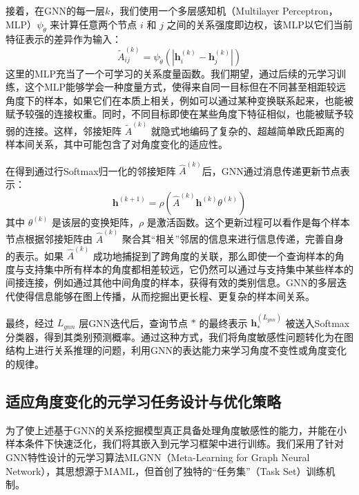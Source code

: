 接着，在GNN的每一层$k$，我们使用一个多层感知机（Multilayer Perceptron，MLP）$\psi_{\tilde{\theta}}$ 来计算任意两个节点 $i$ 和 $j$ 之间的关系强度即边权，该MLP以它们当前特征表示的差异作为输入：
\begin{equation}
    \tilde{A}_{ij}^{(k)} = \psi_{\tilde{\theta}}(|\mathbf{h}_i^{(k)} - \mathbf{h}_j^{(k)}|)
    \label{eq:edge_weight_mlp}
\end{equation}
这里的MLP充当了一个可学习的关系度量函数。我们期望，通过后续的元学习训练，这个MLP能够学会一种度量方式，使得来自同一目标但在不同甚至相距较远角度下的样本，如果它们在本质上相关，例如可以通过某种变换联系起来，也能被赋予较强的连接权重。同时，不同目标即使在某些角度下特征相似，也能被赋予较弱的连接。这样，邻接矩阵 $\tilde{A}^{(k)}$ 就隐式地编码了复杂的、超越简单欧氏距离的样本间关系，其中可能包含了对角度变化的适应性。

在得到通过行Softmax归一化的邻接矩阵 $\hat{A}^{(k)}$后，GNN通过消息传递更新节点表示：
\begin{equation}
    \mathbf{h}^{(k+1)} = \rho(\hat{A}^{(k)} \mathbf{h}^{(k)} \theta^{(k)})
    \label{eq:gnn_update_angle}
\end{equation}
其中 $\theta^{(k)}$ 是该层的变换矩阵，$\rho$ 是激活函数。这个更新过程可以看作是每个样本节点根据邻接矩阵由 $\hat{A}^{(k)}$ 聚合其“相关”邻居的信息来进行信息传递，完善自身的表示。如果 $\hat{A}^{(k)}$ 成功地捕捉到了跨角度的关联，那么即使一个查询样本的角度与支持集中所有样本的角度都相差较远，它仍然可以通过与支持集中某些样本的间接连接，例如通过其他中间角度的样本，获得有效的类别信息。GNN的多层迭代使得信息能够在图上传播，从而挖掘出更长程、更复杂的样本间关系。

最终，经过 $L_{gnn}$ 层GNN迭代后，查询节点 $*$ 的最终表示 $\mathbf{h}_*^{(L_{gnn})}$ 被送入Softmax分类器，得到其类别预测概率。通过这种方式，我们将角度敏感性问题转化为在图结构上进行关系推理的问题，利用GNN的表达能力来学习角度不变性或角度变化的规律。

\subsection{适应角度变化的元学习任务设计与优化策略}
\label{subsec:meta_learning_angle}

为了使上述基于GNN的关系挖掘模型真正具备处理角度敏感性的能力，并能在小样本条件下快速泛化，我们将其嵌入到元学习框架中进行训练。我们采用了针对GNN特性设计的元学习算法MLGNN（Meta-Learning for Graph Neural Network），其思想源于MAML，但首创了独特的“任务集”（Task Set）训练机制。

